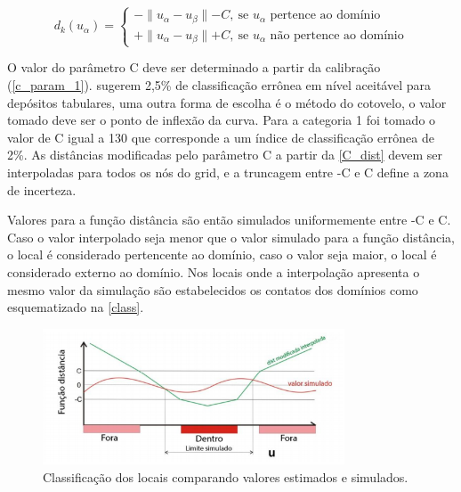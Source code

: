 \begin{equation}
	d_k(u_\alpha)=\begin{cases}
	-\parallel u_\alpha-u_\beta\parallel - C,\:\textrm{se $u_\alpha$ pertence ao domínio}\\
	+\parallel u_\alpha-u_\beta\parallel + C,\:\textrm{se $u_\alpha$ não pertence ao domínio}\end{cases}
    \label{C_dist}
\end{equation}

O valor do parâmetro C deve ser determinado a partir da calibração (\autoref{c_param_1}).  sugerem 2,5\% de classificação errônea em nível aceitável para depósitos tabulares, uma outra forma de escolha é o método do cotovelo, o valor tomado deve ser o ponto de inflexão da curva. Para a categoria 1 foi tomado o valor de C igual a 130 que corresponde a um índice de classificação errônea de 2\%. As distâncias modificadas pelo parâmetro C a partir da \autoref{C_dist} devem ser interpoladas para todos os nós do grid, e a truncagem entre -C e C define a zona de incerteza.

Valores para a função distância são então simulados uniformemente entre -C e C. Caso o valor interpolado seja menor que o valor simulado para a função distância, o local é considerado pertencente ao domínio, caso o valor seja maior, o local é considerado externo ao domínio. Nos locais onde a interpolação apresenta o mesmo valor da simulação são estabelecidos os contatos dos domínios como esquematizado na \autoref{class}.

\begin{figure}[!ht]
	\caption{\label{class}Classificação dos locais comparando valores estimados e simulados.}
	\begin{center}
		\includegraphics[width=0.8\textwidth]{capitulo_2/classificacao.png}
	\end{center}
\end{figure}


